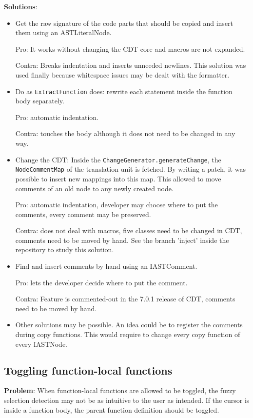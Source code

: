 \textbf{Solutions}:
\begin{itemize}
\item Get the raw signature of the code parts that should be copied and insert 
them using an ASTLiteralNode. 

Pro: It works without changing the CDT core and macros are not expanded. 

Contra: Breaks indentation and inserts unneeded newlines. This solution was used 
finally because whitespace issues may be dealt with the formatter.
\item Do as \texttt{ExtractFunction} does: rewrite each statement inside the 
function body separately. 

Pro: automatic indentation. 

Contra: touches the body although it does not need to be changed in any way. 
\item Change the CDT: Inside the \texttt{ChangeGenerator.generateChange}, the 
\texttt{NodeCommentMap} of the translation unit is fetched. By writing a patch, 
it was possible to insert new mappings into this map. This allowed to move 
comments of an old node to any newly created node. 

Pro: automatic indentation, developer may choose where to put the comments, 
every comment may be preserved. 

Contra: does not deal with macros, five classes need to be changed in CDT, 
comments need to be moved by hand. See the branch 'inject' inside the repository 
to study this solution.
\item Find and insert comments by hand using an IASTComment. 

Pro: lets the developer decide where to put the comment. 

Contra: Feature is commented-out in the 7.0.1 release of CDT, comments need to 
be moved by hand.
\item Other solutions may be possible. An idea could be to register the comments 
during copy functions. This would require to change every copy function of every 
IASTNode. 
\end{itemize}

\subsection{Toggling function-local functions}
\textbf{Problem}: When function-local functions are allowed to be toggled, the 
fuzzy selection detection may not be as intuitive to the user as intended. If 
the cursor is inside a function body, the parent function definition should be 
toggled.

